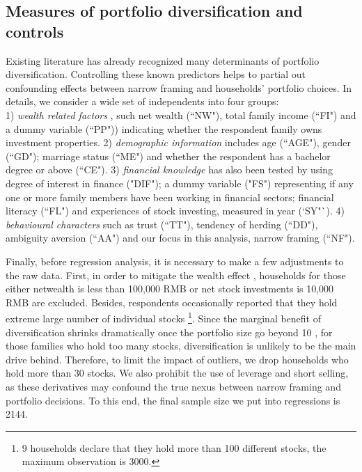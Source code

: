 \documentclass[ukenglish,nottitlepage,thmsb,11pt,letterpaper]{article}
\begin{document}
\subsection{Measures of portfolio diversification and controls}

Existing literature has already recognized many determinants of portfolio diversification. Controlling these known predictors helps to partial out confounding effects between narrow framing and households' portfolio choices. In details, we consider a wide set of independents into four groups: \\ 
 1) \textit{wealth related factors} \citep[e.g.,][]{Mankiw1991,Poterba2003,Calvet2007,Cocco2005}, such net wealth (``NW"), total family income (``FI") and a dummy variable (``PP")) indicating whether the respondent family owns investment properties.  2) \textit{demographic information} \citep{Campbell2006} includes age (``AGE"), gender (``GD"); marriage status (``ME") and whether the respondent has a bachelor degree or above (``CE"). 3) \textit{financial knowledge} \citep[e.g.,][]{Hibbert2012,Fuertes2014,Balloch2014,Gaudecker2015} has also been tested by using degree of interest in finance ("DIF"); a dummy variable ("FS") representing if any one or more family members have been working in financial sectors; financial literacy (``FL") and experiences of stock investing, measured in year (`SY"`). 4) \textit{behavioural characters} \citep{Guiso2008, Fuertes2014,Gaudecker2015, Dimmock2016} such as trust (``TT"), tendency of herding (``DD"), ambiguity aversion (``AA") and our focus in this analysis, narrow framing (``NF").

Finally, before regression analysis, it is necessary to make a few adjustments to the raw data. First, in order to mitigate the wealth effect \citep{Vissing-Jorgensen2002,Vissing-Jorgensen2003,Goetzmann2008}, households for those either netwealth is less than 100,000 RMB or net stock investments is 10,000 RMB are excluded. Besides, respondents occasionally reported that they hold extreme large number of individual stocks \footnote{ 9 households declare that they hold more than 100 different stocks, the maximum observation is 3000.}. Since the marginal benefit of diversification shrinks dramatically once the portfolio size go beyond 10 \citep{Evans1968}, for those families who hold too many stocks, diversification is unlikely to be the main drive behind. Therefore, to limit the impact of outliers, we drop households who hold more than 30 stocks. We also prohibit the use of leverage and short selling, as these derivatives may confound the true nexus between narrow framing and portfolio decisions. To this end, the final sample size we put into regressions is 2144.
\end{document}
